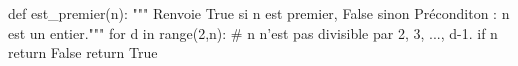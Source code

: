 \exer{}
\setcounter{numques}{0}


\begin{pyverbatim}
def est_premier(n):
    """ Renvoie True si n est premier, False sinon
        Préconditon : n est un entier."""
    for d in range(2,n):
        # n n'est pas divisible par 2, 3, ..., d-1.
        if n %
            return False
    return True
\end{pyverbatim}